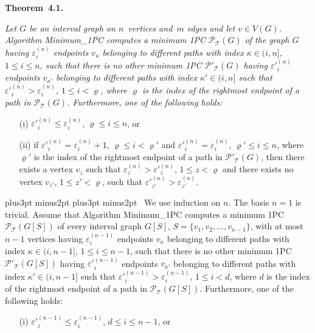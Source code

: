 \documentclass[10pt]{article}
\def\yskip{\penalty-50\vskip3pt plus3pt minus2pt}
\def\yy{\yskip\yskip}
\def\s{\ }
\begin{document}
{\bigskip
\par\noindent
{\bf Theorem~4.1.} {\it Let $G$ be an interval graph on
$n$~vertices and~$m$ edges and let $v \in V(G)$. Algorithm
Minimum\_1PC computes a minimum 1PC $\mathcal{P_{\mathcal{T}}}(G)$
of the graph $G$ having $\varepsilon^{(n)}_i$ endpoints $v_\kappa$
belonging to different paths with index $\kappa \in (i,n]$, $1
\leq i \leq n$, such that there is no other minimum 1PC
$\mathcal{P'_{\mathcal{T}}}(G)$ having $\varepsilon'^{(n)}_i$
endpoints $v_{\kappa'}$ belonging to different paths with index
$\kappa' \in (i,n]$ such that
$\varepsilon'^{(n)}_i>\varepsilon^{(n)}_i$, $1 \leq i < \varrho$,
where $\varrho$ is the index of the rightmost endpoint of a path
in $\mathcal{P_{\mathcal{T}}}(G)$. Furthermore, one of the
following holds:
\begin{itemize}
\item[(i)] $\varepsilon'^{(n)}_i \leq \varepsilon^{(n)}_i$,
$\varrho \leq i \leq n$, or \item[(ii)] if $\varepsilon'^{(n)}_i =
\varepsilon^{(n)}_i +1$, $\varrho \leq i < \varrho'$ and
$\varepsilon'^{(n)}_i = \varepsilon^{(n)}_i$, $\varrho' \leq i
\leq n$, where $\varrho'$ is the index of the rightmost endpoint
of a path in $\mathcal{P'_{\mathcal{T}}}(G)$, then there exists a
vertex $v_z$ such that $\varepsilon^{(n)}_z >
\varepsilon'^{(n)}_z$, $1 \leq z < \varrho$ and there exists no
vertex $v_{z'}$, $1 \leq z' <\varrho$, such that
$\varepsilon'^{(n)}_{z'}>\varepsilon^{(n)}_{z'}$.
\end{itemize}}

\yy {} \s We use induction on $n$. The basis
$n=1$ is trivial. Assume that Algorithm Minimum\_1PC computes a
minimum 1PC $\mathcal{P_{\mathcal{T}}}(G[S])$ of every interval
graph $G[S]$, $S=\{v_1, v_2, \ldots, v_{n-1}\}$, with at most
$n-1$ vertices having $\varepsilon^{(n-1)}_i$ endpoints $v_\kappa$
belonging to different paths with index $\kappa \in (i,n-1]$, $1
\leq i \leq n-1$, such that there is no other minimum 1PC
$\mathcal{P'_{\mathcal{T}}}(G[S])$ having $\varepsilon'^{(n-1)}_i$
endpoints $v_{\kappa'}$ belonging to different paths with index
$\kappa' \in (i,n-1]$ such that
$\varepsilon'^{(n-1)}_i>\varepsilon^{(n-1)}_i$, $1 \leq i < d$,
where $d$ is the index of the rightmost endpoint of a path in
$\mathcal{P_{\mathcal{T}}}(G[S])$. Furthermore, one of the
following holds:
\begin{itemize}
\item[(i)] $\varepsilon'^{(n-1)}_i \leq \varepsilon^{(n-1)}_i$, $d
\leq i \leq n-1$, or


\end{itemize}}
\end{document}
